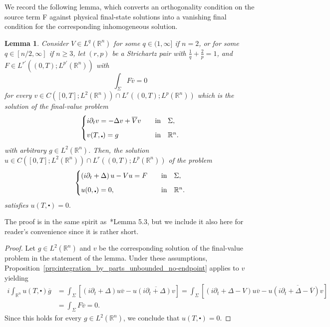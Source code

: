 \documentclass[11pt,a4paper]{amsart}
\newtheorem{lemma}[proposition]{Lemma}
\theoremstyle{remark}
\theoremstyle{definition}
\newcommand{\R}{\mathbb{R}}
\def\ovl{\overline}
\def\cd{\centerdot}
\def\d{\partial}
\begin{document}
We record the following lemma, which converts an orthogonality condition on the source term F against physical final-state solutions into a vanishing final condition for the corresponding inhomogeneous solution.
\begin{lemma}\label{lem:CR_lemma4.4_Lp}\sl Consider $V\in L^q(\R^n)$ for some $q\in(1,\infty]$ if $n=2$, or for some $q\in[n/2,\infty]$ if $n\geq 3$, let $(r, p)$ be a Strichartz pair with $\frac{1}{q}+\frac{2}{p}=1$, and $F\in L^{r'}((0,T); L^{p'}(\R^n))$ with 
\[
\int_\Sigma F \ovl{v} = 0
\]
for every $v\in C([0, T]; L^2(\R^n)) \cap L^r((0, T); L^p(\R^n))$  which is the solution of the final-value problem 
\[
\begin{cases}
i\d_t v = - \Delta v + \ovl{V} v\quad &\textrm{in}\quad \Sigma,
\vspace{.6em}
\\
v(T, \cd)= g  \quad &\textrm{in}\quad \R^n.
\end{cases}
\]
with arbitrary $g\in L^2(\R^n)$. Then, the solution $u\in C([0, T]; L^2(\R^n)) \cap L^r((0, T); L^p(\R^n))$ of the problem
\[
\begin{cases}
\left(i\partial_t +\Delta\right)u-Vu=F\quad &\textrm{in}\quad \Sigma,
\vspace{.6em}
\\
u(0,\cd)=0, \quad &\textrm{in}\quad \R^n.
\end{cases}
\]
satisfies $u(T, \cd) = 0. $
\end{lemma}

The proof is in the same spirit as~\cite{caro2025initialtofinalstateinverseproblemunbounded}*{Lemma 5.3}, but we include it also here for reader's convenience since it is rather short. 


\begin{proof} Let $g\in L^2(\R^n)$ and $v$ be the corresponding solution of the final-value problem in the statement of the lemma. Under these assumptions, Proposition~\ref{prp:integration_by_parts_unbounded_no-endpoint} applies to $v$ yielding
\begin{align*}
i \int_{\R^n} u(T, \cd) \ovl{g} &= \int_\Sigma \left[ \left(i \d_t +\Delta\right)u \ovl{v} - u \ovl{(i\d_t + \Delta)v} \right]
= \int_\Sigma \left[ \left(i \d_t +\Delta - V\right)u\ovl{v} - u \ovl{\left(i \d_t + \Delta - \ovl{V}\right)v}  \right] 
\\
&= \int_\Sigma F \ovl{v}  = 0.
\end{align*}
Since this holds for every $g\in L^2(\R^n)$, we  conclude that $u(T, \cd) = 0$. 
\end{proof}
\end{document}
